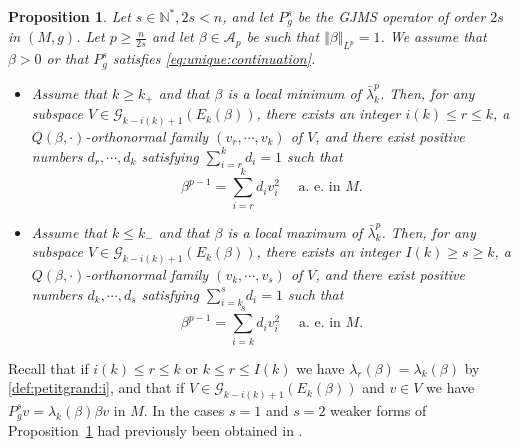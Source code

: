 \documentclass[10pt]{amsart}
\numberwithin{equation}{section}
\theoremstyle{plain}
\newtheorem{prop}[theo]{Proposition}%
\theoremstyle{remark}
\begin{document}
\begin{prop} \label{euler_minimizer}
Let $s \in \mathbb{N}^*, 2s <n$, and let $P_g^s$ be the GJMS operator of order $2s$ in $(M,g)$. Let $p \geq \frac{n}{2s}$ and let $\beta \in \mathcal{A}_p$ be such that $\Vert \beta \Vert_{L^p} = 1$. We assume that $\beta >0$ or that $P_g^s$ satisfies \eqref{eq:unique:continuation}.  %
\begin{itemize}
\item Assume that $k \ge k_+$ and that $\beta$ is a local minimum of $\bar{\lambda}^p_k$. Then, for any subspace $V \in \mathcal{G}_{k-i(k)+1}(E_k(\beta))$, there exists an integer $i(k) \leq r \leq k$, a $Q(\beta,\cdot)$-orthonormal family $(v_{r},\cdots,v_k)$ of $V$, and there exist positive numbers $d_r,\cdots,d_k$ satisfying $\sum_{i=r}^k d_i = 1$ such that 
$$   \beta^{p-1} = \sum_{i=r}^k d_i v_i^2 \quad \text{ a. e. in } M.$$
\item  Assume that $k \le k_-$ and that $\beta$ is a local maximum of $\bar{\lambda}^p_k$. Then, for any subspace $V \in \mathcal{G}_{k-i(k)+1}(E_k(\beta))$, there exists an integer $I(k) \geq s \geq k$, a $Q(\beta,\cdot)$-orthonormal family $(v_{k},\cdots,v_s)$ of $V$, and there exist positive numbers $d_k,\cdots,d_s$ satisfying $\sum_{i=k}^s d_i = 1$ such that 
\begin{equation*}
 \beta^{p-1} = \sum_{i=k}^sd_i v_i^2 \quad \text{ a. e. in } M.
 \end{equation*}
\end{itemize}
\end{prop}
Recall that if $i(k) \le r \le k$ or $k \le r \le I(k)$ we have $\lambda_r(\beta) = \lambda_k(\beta)$ by \eqref{def:petitgrand:i}, and that if $V \in \mathcal{G}_{k-i(k)+1}(E_k(\beta))$ and $v \in V$ we have $P_g^s v = \lambda_k(\beta) \beta v$ in $M$. In the cases $s=1$ and $s=2$ weaker forms of Proposition~\ref{euler_minimizer} had previously been obtained in \cite{GurskyPerez, Perez_Ayala_2022}.
\end{document}
